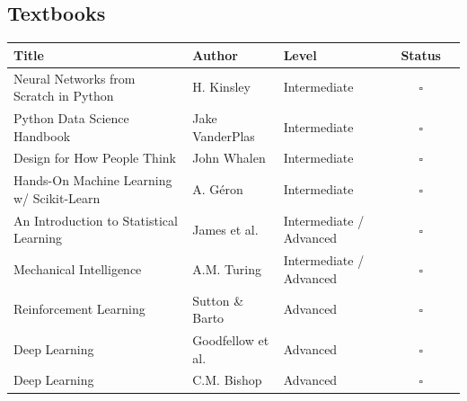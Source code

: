\documentclass[10pt]{article}
\begin{document}
\subsection{Textbooks}
\begin{center}
\begin{tabularx}{\textwidth}{X l l c c}
    \toprule
    \textbf{Title} & \textbf{Author} & \textbf{Level} & \textbf{Status} \\
    \midrule
    Neural Networks from Scratch in Python              & H. Kinsley                 & Intermediate               & $\square$ \\
    Python Data Science Handbook                        & Jake VanderPlas            & Intermediate               & $\square$ \\
    Design for How People Think                         & John Whalen                & Intermediate               & $\square$ \\
    Hands-On Machine Learning w/ Scikit-Learn           & A. Géron                   & Intermediate               & $\square$ \\
    An Introduction to Statistical Learning             & James et al.               & Intermediate / Advanced    & $\square$ \\
    Mechanical Intelligence                             & A.M. Turing                & Intermediate / Advanced    & $\square$ \\
    Reinforcement Learning                              & Sutton \& Barto            & Advanced                   & $\square$ \\
    Deep Learning                                       & Goodfellow et al.          & Advanced                   & $\square$ \\
    Deep Learning                                       & C.M. Bishop                & Advanced                   & $\square$ \\
    \bottomrule
\end{tabularx}
\end{center}
\end{document}

